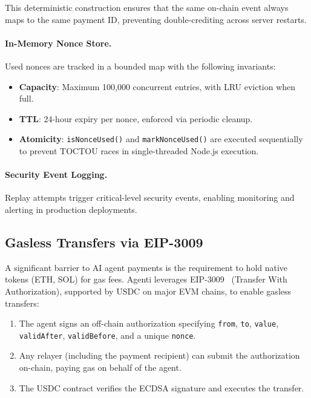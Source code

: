 \documentclass[11pt]{article}
\begin{document}
This deterministic construction ensures that the same on-chain event always maps to the same payment ID, preventing double-crediting across server restarts.

\paragraph{In-Memory Nonce Store.} Used nonces are tracked in a bounded map with the following invariants:
\begin{itemize}[leftmargin=*]
  \item \textbf{Capacity}: Maximum 100,000 concurrent entries, with LRU eviction when full.
  \item \textbf{TTL}: 24-hour expiry per nonce, enforced via periodic cleanup.
  \item \textbf{Atomicity}: \texttt{isNonceUsed()} and \texttt{markNonceUsed()} are executed sequentially to prevent TOCTOU races in single-threaded Node.js execution.
\end{itemize}

\paragraph{Security Event Logging.} Replay attempts trigger critical-level security events, enabling monitoring and alerting in production deployments.

\subsection{Gasless Transfers via EIP-3009}
\label{sec:gasless}

A significant barrier to AI agent payments is the requirement to hold native tokens (ETH, SOL) for gas fees. Agenti leverages EIP-3009~\cite{eip3009} (Transfer With Authorization), supported by USDC on major EVM chains, to enable gasless transfers:

\begin{enumerate}[leftmargin=*]
  \item The agent signs an off-chain authorization specifying \texttt{from}, \texttt{to}, \texttt{value}, \texttt{validAfter}, \texttt{validBefore}, and a unique \texttt{nonce}.
  \item Any relayer (including the payment recipient) can submit the authorization on-chain, paying gas on behalf of the agent.
  \item The USDC contract verifies the ECDSA signature and executes the transfer.
\end{enumerate}
\end{document}
